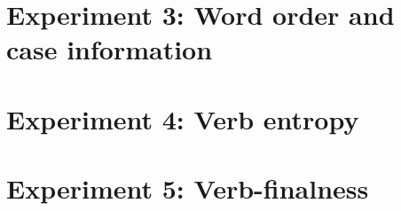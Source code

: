 \section{Experiment 3: Word order and case information}

\section{Experiment 4: Verb entropy}

\section{Experiment 5: Verb-finalness}
